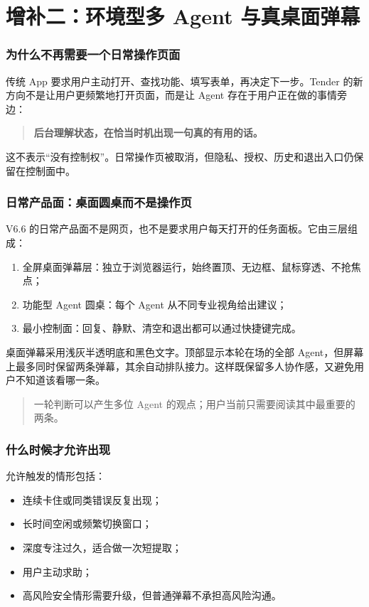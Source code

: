 \documentclass[UTF8,a4paper,11pt]{ctexart}
\begin{document}
\part{增补二：环境型多 Agent 与真桌面弹幕}

\section{为什么不再需要一个日常操作页面}

传统 App 要求用户主动打开、查找功能、填写表单，再决定下一步。Tender 的新方向不是让用户更频繁地打开页面，而是让 Agent 存在于用户正在做的事情旁边：

\begin{quote}
\textbf{后台理解状态，在恰当时机出现一句真的有用的话。}
\end{quote}

这不表示“没有控制权”。日常操作页被取消，但隐私、授权、历史和退出入口仍保留在控制面中。

\section{日常产品面：桌面圆桌而不是操作页}

V6.6 的日常产品面不是网页，也不是要求用户每天打开的任务面板。它由三层组成：

\begin{enumerate}[leftmargin=2em]
\item 全屏桌面弹幕层：独立于浏览器运行，始终置顶、无边框、鼠标穿透、不抢焦点；
\item 功能型 Agent 圆桌：每个 Agent 从不同专业视角给出建议；
\item 最小控制面：回复、静默、清空和退出都可以通过快捷键完成。
\end{enumerate}

桌面弹幕采用浅灰半透明底和黑色文字。顶部显示本轮在场的全部 Agent，但屏幕上最多同时保留两条弹幕，其余自动排队接力。这样既保留多人协作感，又避免用户不知道该看哪一条。

\begin{quote}
一轮判断可以产生多位 Agent 的观点；用户当前只需要阅读其中最重要的两条。
\end{quote}

\section{什么时候才允许出现}

允许触发的情形包括：

\begin{itemize}[leftmargin=2em]
\item 连续卡住或同类错误反复出现；
\item 长时间空闲或频繁切换窗口；
\item 深度专注过久，适合做一次短提取；
\item 用户主动求助；
\item 高风险安全情形需要升级，但普通弹幕不承担高风险沟通。
\end{itemize}
\end{document}
